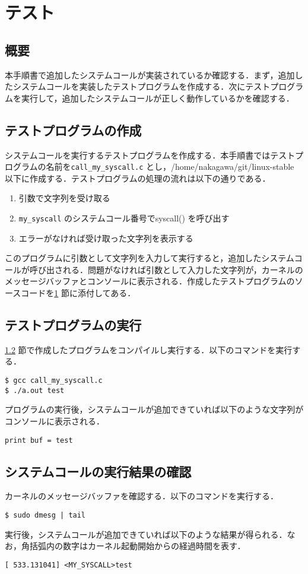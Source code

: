 \documentclass[12pt]{jsarticle}
\begin{document}
\section{テスト}\label{sec:test}
 \subsection{概要}
 本手順書で追加したシステムコールが実装されているか確認する．まず，追加したシステムコールを実装したテストプログラムを作成する．次にテストプログラムを実行して，追加したシステムコールが正しく動作しているかを確認する．
\subsection{テストプログラムの作成}\label{sec:test_sakusei}
システムコールを実行するテストプログラムを作成する．本手順書ではテストプログラムの名前を\verb|call_my_syscall.c| とし，/home/nakagawa/git/linux-stable 以下に作成する．テストプログラムの処理の流れは以下の通りである．
\begin{enumerate}
 \item 引数で文字列を受け取る
 \item \verb|my_syscall| のシステムコール番号でsyscall() を呼び出す
 \item エラーがなければ受け取った文字列を表示する
\end{enumerate}
このプログラムに引数として文字列を入力して実行すると，追加したシステムコールが呼び出される．問題がなければ引数として入力した文字列が，カーネルのメッセージバッファとコンソールに表示される．作成したテストプログラムのソースコードを\ref{sec:test} 節に添付してある．
\subsection{テストプログラムの実行}
\ref{sec:test_sakusei} 節で作成したプログラムをコンパイルし実行する．以下のコマンドを実行する．
\begin{verbatim}
$ gcc call_my_syscall.c
$ ./a.out test
\end{verbatim}
プログラムの実行後，システムコールが追加できていれば以下のような文字列がコンソールに表示される．
\begin{verbatim}
print buf = test
\end{verbatim}
\subsection{システムコールの実行結果の確認}
カーネルのメッセージバッファを確認する．以下のコマンドを実行する．
\begin{verbatim}
$ sudo dmesg | tail
\end{verbatim}
実行後，システムコールが追加できていれば以下のような結果が得られる．なお，角括弧内の数字はカーネル起動開始からの経過時間を表す．
\begin{verbatim}
[ 533.131041] <MY_SYSCALL>test
\end{verbatim}
\end{document}
